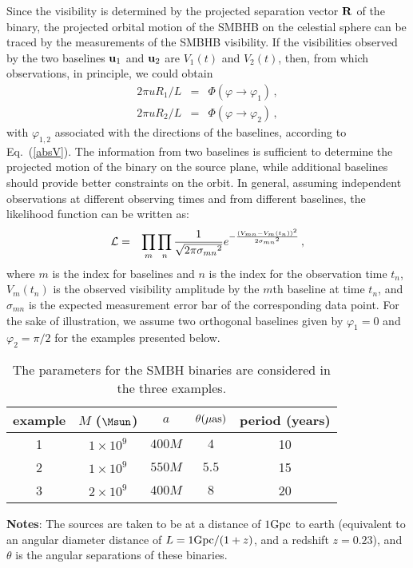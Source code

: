 \documentclass[twocolumn]{aastex62}
\def\m{\begin{eqnarray}}
\def\n{\end{eqnarray}}
\begin{document}
Since the visibility is determined by the projected separation vector ${\bf R}$ of the binary, the projected orbital motion of the SMBHB on the celestial sphere can be traced by the measurements of the SMBHB visibility. If the visibilities observed by the two baselines ${\bf u}_1$ and ${\bf u}_2$ are $V_1(t)$ and $V_2 (t)$, 
then, from which observations, in principle, we could obtain 
\m \label{V_para_perp}
2 \pi {u} {R}_{1}/L&=&\Phi(\varphi \to {\varphi}_1)\,, \nonumber\\
 2 \pi {u} {R}_{2}/L&=&\Phi(\varphi \to {\varphi}_2)\,,
\n 
with $\varphi_{1,2}$ associated with the directions of the baselines, according to Eq.~(\ref{absV}). 
The information from two baselines is sufficient to determine the projected motion of the binary on the source plane, while additional baselines should provide better constraints on the orbit.
In general, assuming independent observations at different observing times and from  different baselines, the likelihood function can be written as:
\m \label{def_likelihood}
\mathcal{L} &=& \prod_m \prod_{n} {1\over \sqrt{2 \pi {\sigma_{m n}}^2}} e^{-{(V_{m n} - V_m (t_n) )^2 \over 2{\sigma_{m n}}^2 } }   \,,
\n
where $m$ is the index for baselines and $n$ is the index for the observation time  $t_n$, $V_m(t_n)$ is the observed visibility amplitude by the $m$th baseline at  time $t_n$, and $\sigma_{m n}$  is the expected measurement error bar of the corresponding data point.  For the sake of illustration, we assume two orthogonal baselines given by $\varphi_1=0$ and $\varphi_2=\pi/2$ for the examples presented below.
%
\begin{table}[h]
\caption{The parameters for the SMBH binaries are considered in the three examples.}
    \centering
    \begin{tabular}{ccccc}
\hline
\hline
example & $M$ ($\Msun$) & $a$ & $\theta (\mu {\rm as})$ & period (years) \\
\hline
1 & $1\times 10^9$ & $400M$ & $4$ & 10 \\
%
2 & $1\times 10^9$ & $550M$  & $5.5$ & 15 \\
%
3 & $2\times 10^9$ & $400M$  & $8$ & 20 \\
%
%
\hline
\end{tabular}
     \begin{tablenotes}
     \item {\bf Notes}:  The sources are taken to be at a distance of $1 {\rm Gpc}$ to earth (equivalent to an angular diameter distance of $L=1 {\rm Gpc}/(1+z)$, and a redshift $z=0.23$), and $\theta$ is the angular separations of these binaries.  
\end{tablenotes} 
\label{table:SMBHs} 
\end{table}
\end{document}
